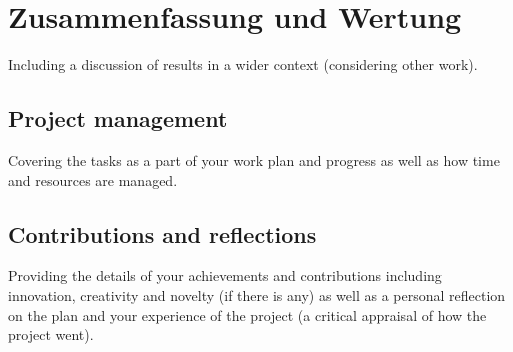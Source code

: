 \chapter{Zusammenfassung und Wertung}\label{ch:summary}

Including a discussion of results in a wider context (considering other work).



\section{Project management}

Covering the tasks as a part of your work plan and progress as well as how time and resources are managed.


\section{Contributions and reflections}

Providing the details of your achievements and contributions including innovation, creativity and novelty (if there is any) as well as a personal reflection on the plan and your experience of the project (a critical appraisal of how the project went).
\cite{cormen2009introduction}